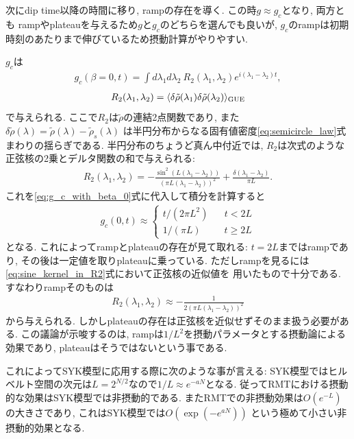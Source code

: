 次にdip time以降の時間に移り, rampの存在を導く. 
この時$g \approx g_c$となり, 両方とも
rampやplateauを与えるため$g$と$g_c$のどちらを選んでも良いが, 
$g_c$のrampは初期時刻のあたりまで伸びているため摂動計算がやりやすい. 

$g_c$は
\begin{align}
	g_c(\beta = 0, t)
	= \int d\lambda_1 d\lambda_2\ 
		R_2(\lambda_1, \lambda_2)e^{i(\lambda_1 - \lambda_2)t},
	\label{eq:g_c_with_beta_0}
\end{align}
\begin{align}
	R_2(\lambda_1, \lambda_2)
	= \langle \delta\tilde{\rho}(\lambda_1)\delta\tilde{\rho}(\lambda_2) \rangle_{\mathrm{GUE}}
	\label{eq:fourier_transfomed_g_c}
\end{align}
で与えられる. 
ここで$R_2$は$\tilde{\rho}$の連結2点関数であり, また
$\delta\tilde{\rho}(\lambda) = \tilde{\rho}(\lambda) - \tilde{\rho}_s(\lambda)$
は半円分布からなる固有値密度\eqref{eq:semicircle_law}式まわりの揺らぎである. 
半円分布のちょうど真ん中付近では, $R_2$は次式のような正弦核の2乗とデルタ関数の和で与えられる:
\begin{align}
	R_2(\lambda_1, \lambda_2)
	= -\frac{\sin^2(L(\lambda_1 - \lambda_2))}{(\pi L(\lambda_1 - \lambda_2))^2}
		+ \frac{\delta(\lambda_1 - \lambda_2)}{\pi L}.
	\label{eq:sine_kernel_in_R2}
\end{align}
これを\eqref{eq:g_c_with_beta_0}式に代入して積分を計算すると
\begin{align}
	g_c(0, t) \approx 
	\left\{
		\begin{matrix}
			t/(2\pi L^2) \hspace{20pt}t < 2L\\
			1/(\pi L)    \hspace{29pt}t \geq 2L
		\end{matrix}			
	\right.
\end{align}
となる. 
これによってrampとplateauの存在が見て取れる:
$t = 2L$まではrampであり, その後は一定値を取りplateauに乗っている. 
ただしrampを見るには\eqref{eq:sine_kernel_in_R2}式において正弦核の近似値を
用いたもので十分である. すなわりrampそのものは
\begin{align}
	R_2(\lambda_1, \lambda_2) \approx -\frac{1}{2(\pi L(\lambda_1 - \lambda_2))^2}
\end{align}
から与えられる. 
しかしplateauの存在は正弦核を近似せずそのまま扱う必要がある. 
この議論が示唆するのは, rampは$1/L^2$を摂動パラメータとする摂動論による効果であり, 
plateauはそうではないという事である. 

これによってSYK模型に応用する際に次のような事が言える:
SYK模型ではヒルベルト空間の次元は$L = 2^{N/2}$なので$1/L \approx e^{-aN}$となる. 
従ってRMTにおける摂動的な効果はSYK模型では非摂動的である. 
またRMTでの非摂動効果は$O(e^{-L})$の大きさであり, これはSYK模型では$O(\exp(-e^{aN}))$
という極めて小さい非摂動的効果となる. 

